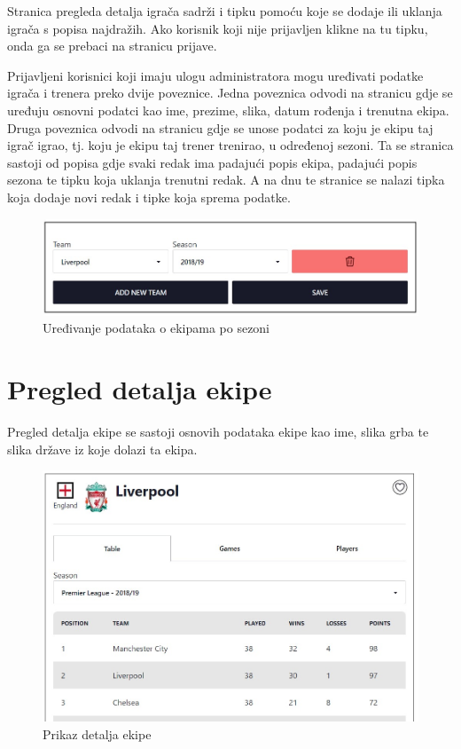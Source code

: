 \documentclass[times, utf8, zavrsni]{fer}
\begin{document}
Stranica pregleda detalja igrača sadrži i tipku pomoću koje se dodaje ili uklanja igrača s popisa najdražih. Ako korisnik koji nije prijavljen klikne na tu tipku, onda ga se prebaci na stranicu prijave.

Prijavljeni korisnici koji imaju ulogu administratora mogu uređivati podatke igrača i trenera preko dvije poveznice.
Jedna poveznica odvodi na stranicu gdje se uređuju osnovni podatci kao ime, prezime, slika, datum rođenja i trenutna ekipa.
Druga poveznica odvodi na stranicu gdje se unose podatci za koju je ekipu taj igrač igrao, tj. koju je ekipu taj trener trenirao, u određenoj sezoni.
Ta se stranica sastoji od popisa gdje svaki redak ima padajući popis ekipa, padajući popis sezona te tipku koja uklanja trenutni redak.
A na dnu te stranice se nalazi tipka koja dodaje novi redak i tipke koja sprema podatke.

\begin{figure}[htb]
\centering
\includegraphics[width=14cm]{images/per-season.jpg}
\caption{Uređivanje podataka o ekipama po sezoni}
\label{fig:per-season}
\end{figure}

\newpage
\section{Pregled detalja ekipe}

Pregled detalja ekipe se sastoji osnovih podataka ekipe kao ime, slika grba te slika države iz koje dolazi ta ekipa.

\begin{figure}[htb]
\centering
\includegraphics[width=14cm]{images/team.jpg}
\caption{Prikaz detalja ekipe}
\label{fig:per-season}
\end{figure}
\end{document}
